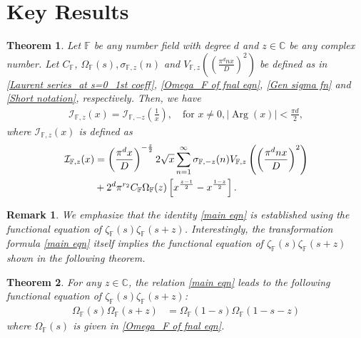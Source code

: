 \documentclass[12pt,reqno]{amsart}
\newcommand{\Arg}{\operatorname{Arg}}
\renewcommand{\(}{\left\(}
\renewcommand{\)}{\right\)}
\renewcommand{\[}{\left\[}
\renewcommand{\]}{\right\]}
\numberwithin{equation}{section}
\theoremstyle{plain}
\newtheorem{theorem}{Theorem}[section]
\newtheorem{remark}[]{Remark}
\begin{document}
\section{{\bf Key Results}}
\begin{theorem}\label{Main thm 1}
Let $\mathbb{F}$ be any number field with degree $d$ and $z \in \mathbb{C}$ be any complex number. Let $C_{\mathbb{F}}$, $\Omega_{\mathbb{F}}(s), \sigma_{\mathbb{F}, z}(n)$ and $V_{\mathbb{F},z}\left(\left(\frac{\pi^{d} n x}{D}\right)^2\right)$ be defined as in \eqref{Laurent series_at s=0_1st coeff}, \eqref{Omega_F of fnal eqn}, \eqref{Gen sigma fn} and \eqref{Short notation}, respectively. Then, we have
\begin{align}\label{main eqn}
\mathcal{I}_{\mathbb{F}, z}(x) = \mathcal{I}_{\mathbb{F}, -z}\left(\frac{1}{x}\right), \quad \mathrm{for} \,\, x \neq 0,  |\Arg(x)| < \frac{\pi d}{2},
\end{align}
where $\mathcal{I}_{\mathbb{F}, z}(x)$ is defined as
\begin{align}
\mathcal{I}_{\mathbb{F}, z}(x) &= \left(\frac{\pi^d x}{D}\right)^{-\frac{z}{2}}2\sqrt{x}\sum_{n=1}^{\infty}\sigma_{\mathbb{F}, -z}(n)V_{\mathbb{F},z}\left(\left(\frac{\pi^{d} n x}{D}\right)^2\right) \notag\\
&+ 2^d\pi^{r_2}C_{\mathbb{F}}\Omega_{\mathbb{F}}(z)\left[x^{\frac{z-1}{2}} - x^{\frac{1-z}{2}}\right].\label{Defn of I_F}
\end{align}
\end{theorem}
\begin{remark}
We emphasize that the identity \eqref{main eqn} is established using the
functional equation of $\zeta_{\mathbb{F}}(s)\zeta_{\mathbb{F}}(s+z)$.
Interestingly, the transformation formula \eqref{main eqn} itself implies the functional equation of $\zeta_{\mathbb{F}}(s)\zeta_{\mathbb{F}}(s+z)$ shown in the following theorem.
\end{remark}

\begin{theorem}\label{Converse of main thm}
For any $z \in \mathbb{C}$, the relation \eqref{main eqn} leads to the following functional equation of $\zeta_{\mathbb{F}}(s)\zeta_{\mathbb{F}}(s+z)$:
\begin{align*}
\Omega_{\mathbb{F}}(s)\Omega_{\mathbb{F}}(s+z) &= \Omega_{\mathbb{F}}(1-s)\Omega_{\mathbb{F}}(1-s-z)
\end{align*}
where $\Omega_{\mathbb{F}}(s)$ is given in \eqref{Omega_F of fnal eqn}.
\end{theorem}
\end{document}
